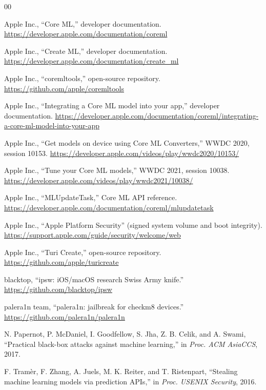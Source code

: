 \documentclass[letterpaper,twocolumn,10pt]{article}
\begin{document}
\begin{thebibliography}{00}

Apple Inc., ``Core ML,'' developer documentation.
\url{https://developer.apple.com/documentation/coreml}

Apple Inc., ``Create ML,'' developer documentation.
\url{https://developer.apple.com/documentation/create_ml}

Apple Inc., ``coremltools,'' open-source repository.
\url{https://github.com/apple/coremltools}

Apple Inc., ``Integrating a Core ML model into your app,'' developer
documentation.
\url{https://developer.apple.com/documentation/coreml/integrating-a-core-ml-model-into-your-app}

Apple Inc., ``Get models on device using Core ML Converters,'' WWDC 2020,
session 10153.
\url{https://developer.apple.com/videos/play/wwdc2020/10153/}

Apple Inc., ``Tune your Core ML models,'' WWDC 2021, session 10038.
\url{https://developer.apple.com/videos/play/wwdc2021/10038/}

Apple Inc., ``MLUpdateTask,'' Core ML API reference.
\url{https://developer.apple.com/documentation/coreml/mlupdatetask}

Apple Inc., ``Apple Platform Security'' (signed system volume and boot
integrity).
\url{https://support.apple.com/guide/security/welcome/web}

Apple Inc., ``Turi Create,'' open-source repository.
\url{https://github.com/apple/turicreate}

blacktop, ``ipsw: iOS/macOS research Swiss Army knife.''
\url{https://github.com/blacktop/ipsw}

palera1n team, ``palera1n: jailbreak for checkm8 devices.''
\url{https://github.com/palera1n/palera1n}

N. Papernot, P. McDaniel, I. Goodfellow, S. Jha, Z. B. Celik, and
A. Swami, ``Practical black-box attacks against machine learning,'' in
\emph{Proc. ACM AsiaCCS}, 2017.

F. Tram{\`e}r, F. Zhang, A. Juels, M. K. Reiter, and T. Ristenpart,
``Stealing machine learning models via prediction APIs,'' in
\emph{Proc. USENIX Security}, 2016.


\end{thebibliography}
\end{document}
